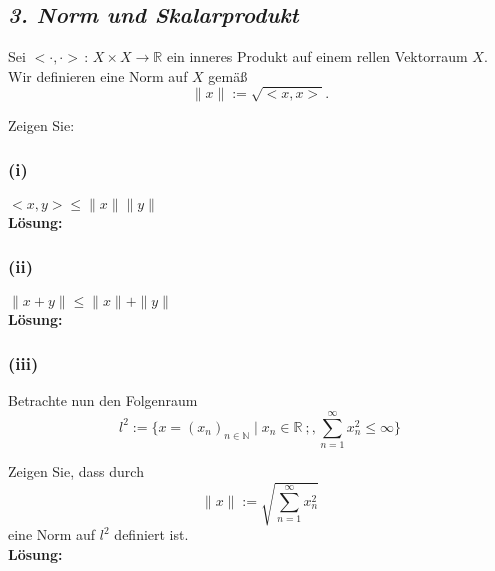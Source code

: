 \subsection*{\itshape 3. Norm und Skalarprodukt}

Sei $<\cdot,\cdot> \, : \, X \times X \rightarrow \mathbb{R}$ ein inneres Produkt auf einem rellen Vektorraum $X$. Wir
definieren eine Norm auf $X$ gemäß
$$
    \| x \| := \sqrt{<x,x>}.
$$

Zeigen Sie:

\subsubsection*{(i)}
$<x,y> \leq \| x \| \| y \|$\\
\textbf{Lösung:}\\

\subsubsection*{(ii)}
$\| x + y \| \leq \| x \| + \| y \|$\\
\textbf{Lösung:}\\

\subsubsection*{(iii)}
Betrachte nun den Folgenraum
$$
    l^2 := \{ x = (x_n)_{n \in \mathbb{N}} \; | \; x_n \in \mathbb{R}\ ; , \overset{\infty}{\underset{n=1}{\sum}} x_n^2 \leq \infty \}
$$

Zeigen Sie, dass durch
$$
    \| x \| := \sqrt{\sum^\infty_{n=1} x_n^2}
$$
eine Norm auf $l^2$ definiert ist.\\

\textbf{Lösung:}\\

